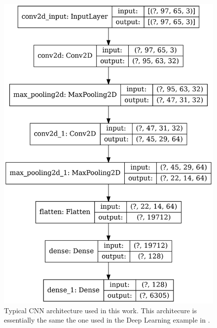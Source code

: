 \documentclass[12pt]{article}
\begin{document}
%
\begin{figure} 
   \centering
    \includegraphics[totalheight=9cm]{Figures/typical_cnn.png}
    \caption{\label{fig:typical_cnn}Typical CNN architecture used in this work. This architecure is essentially the same the one used in the Deep Learning example in \cite{misc:udemy}.}
\end{figure}
%
%
\end{document}
